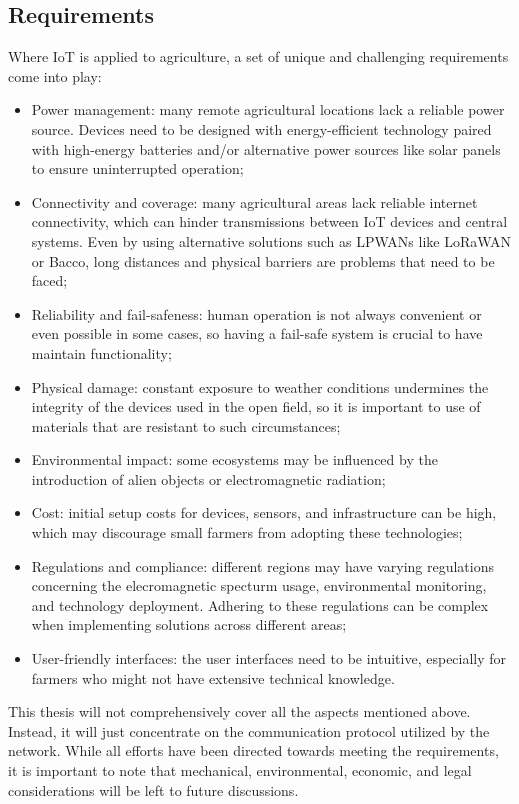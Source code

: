 \subsection{Requirements}
Where \gls{IoT} is applied to agriculture, a set of unique and challenging requirements come into play:
\begin{itemize}
    \item Power management: many remote agricultural locations lack a reliable power source. Devices need to be
        designed with energy-efficient technology paired with high-energy batteries and/or alternative power sources like solar
        panels to ensure uninterrupted operation;
    \item Connectivity and coverage: many agricultural areas lack reliable internet connectivity, which can hinder
        transmissions between IoT devices and central systems. Even by using alternative solutions such as \glspl{LPWAN}
        like LoRaWAN or Bacco, long distances and physical barriers are problems that need to be faced;
    \item Reliability and fail-safeness: human operation is not always convenient or even possible in
        some cases, so having a fail-safe system is crucial to have maintain functionality;
    \item Physical damage: constant exposure to weather conditions undermines the integrity of the devices used in the
        open field, so it is important to use of materials that are resistant to such circumstances;
    \item Environmental impact: some ecosystems may be influenced by the introduction of alien objects or
        electromagnetic radiation;
    \item Cost: initial setup costs for devices, sensors, and infrastructure can be high, which may discourage small
        farmers from adopting these technologies;
    \item Regulations and compliance: different regions may have varying regulations concerning the elecromagnetic
        specturm usage, environmental monitoring, and technology deployment. Adhering to these regulations can be complex when
        implementing solutions across different areas;
    \item User-friendly interfaces: the user interfaces need to be intuitive, especially for farmers who might not
        have extensive technical knowledge.
\end{itemize}
This thesis will not comprehensively cover all the aspects mentioned above. Instead, it will just concentrate on the
communication protocol utilized by the network. While all efforts have been directed towards meeting the requirements,
it is important to note that mechanical, environmental, economic, and legal considerations will be left to future
discussions.

